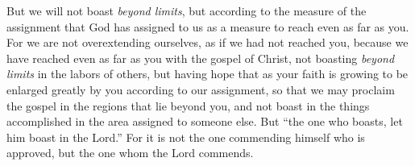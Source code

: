 \begin{biblechapter}
\verse But we will not boast \textit{beyond limits}, but according to the measure of the assignment that God has assigned to us as a measure to reach even as far as you.
\verse For we are not overextending ourselves, as if we had not reached you, because we have reached even as far as you with the gospel of Christ,
\verse not boasting \textit{beyond limits} in the labors of others, but having hope that as your faith is growing to be enlarged greatly by you according to our assignment,
\verse so that we may proclaim the gospel in the regions that lie beyond you, and not boast in the things accomplished in the area assigned to someone else.
\verse But “the one who boasts, let him boast in the Lord.”
\verse For it is not the one commending himself who is approved, but the one whom the Lord commends.
\end{biblechapter}

